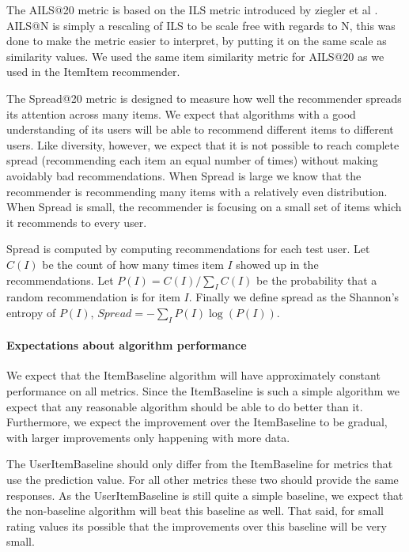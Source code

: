 \documentclass[letterpaper]{sig-alternate}
\begin{document}
  The AILS@20 metric is based on the ILS metric introduced by ziegler et al \cite{zieglerDiversity}.
  AILS@N is simply a rescaling of ILS to be scale free with regards to N, this was done to make the metric easier to interpret, by putting it on the same scale as similarity values.
  We used the same item similarity metric for AILS@20 as we used in the ItemItem recommender.

  The Spread@20 metric is designed to measure how well the recommender spreads its attention across many items.
  We expect that algorithms with a good understanding of its users will be able to recommend different items to different users.
  Like diversity, however, we expect that it is not possible to reach complete spread (recommending each item an equal number of times) without making avoidably bad recommendations.
  When Spread is large we know that the recommender is recommending many items with a relatively even distribution.
  When Spread is small, the recommender is focusing on a small set of items which it recommends to every user.

  Spread is computed by computing recommendations for each test user.
  Let $C(I)$ be the count of how many times item $I$ showed up in the recommendations.
  Let $P(I) = C(I) / \sum_I C(I)$ be the probability that a random recommendation is for item $I$.
  Finally we define spread as the Shannon's entropy of $P(I)$, $Spread = -\sum_I P(I) \log(P(I))$.

  \paragraph{Expectations about algorithm performance}
  We expect that the ItemBaseline algorithm will have approximately constant performance on all metrics.
  Since the ItemBaseline is such a simple algorithm we expect that any reasonable algorithm should be able to do better than it.
  Furthermore, we expect the improvement over the ItemBaseline to be gradual, with larger improvements only happening with more data.

  The UserItemBaseline should only differ from the ItemBaseline for metrics that use the prediction value.
  For all other metrics these two should provide the same responses.
  As the UserItemBaseline is still quite a simple baseline, we expect that the non-baseline algorithm will beat this baseline as well.
  That said, for small rating values its possible that the improvements over this baseline will be very small.
  
\end{document}
